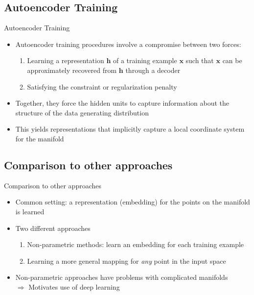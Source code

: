 \documentclass[handout]{beamer}
\begin{document}
\subsection{Autoencoder Training}
\begin{frame}[t]{Autoencoder Training}
    \begin{itemize}
        \item Autoencoder training procedures involve a compromise between two forces:
        \pause
            \begin{enumerate}
                \item Learning a representation $\pmb{h}$ of a training example $\pmb{x}$ such that $\pmb{x}$ can be approximately recovered from $\pmb{h}$ through a decoder
        \pause
                \item Satisfying the constraint or regularization penalty
            \end{enumerate}
        \pause
       \item Together, they force the hidden units to capture information about the structure of the data generating distribution
        \pause
    \item This yields representations that implicitly capture a local coordinate system for the manifold
   \end{itemize}
\end{frame}


\subsection{Comparison to other approaches}
\begin{frame}[t]{Comparison to other approaches}
    \begin{itemize}
        \item Common setting: a representation (embedding) for the points on the manifold is learned
        \pause
        \item Two different approaches
        \pause
            \begin{enumerate}
                \item Non-parametric methods: learn an embedding for each training example
        \pause
                \item Learning a more general mapping for \textit{any} point in the input space
            \end{enumerate}
        \pause
        \item Non-parametric approaches have problems with complicated manifolds\\
        \pause
            $\Rightarrow$ Motivates use of deep learning 
    \end{itemize}
\end{frame}
\end{document}
